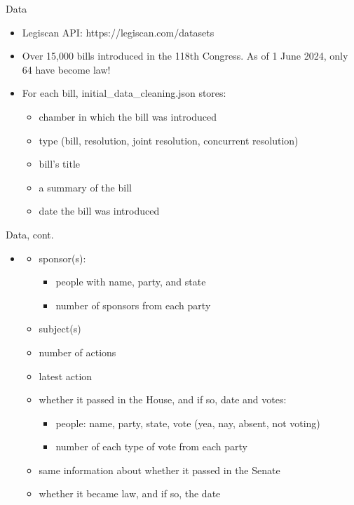 \documentclass[handout,
	12pt]{beamer}
\begin{document}
\begin{frame}{Data}{}
\pause
\begin{itemize}
\item Legiscan API: https://legiscan.com/datasets
\pause
\item Over 15,000 bills introduced in the 118th Congress.  As of 1 June 2024, only 64 have become law!
\pause
\item For each bill, initial\_data\_cleaning.json stores:

\vspace{-0.5pc}
\begin{multicols}{2}
{\small
\begin{itemize}
\itemsep0em
\item chamber in which the bill was introduced
\item type (bill, resolution, joint resolution, concurrent resolution)
\item bill's title
\item a summary of the bill
\item date the bill was introduced
\end{itemize}
}
\end{multicols}
\end{itemize}
\end{frame}
	
\note{
\begin{itemize}
\end{itemize}
}

\begin{frame}{Data, cont.}
\begin{itemize}
\item[]
\begin{multicols}{2}
{\small
\begin{itemize}
\itemsep0em
\item sponsor(s): 
{\footnotesize 
\begin{itemize}
\itemsep0em
\item people with name, party, and state
\item number of sponsors from each party
\end{itemize}
}
\item subject(s)
\item number of actions
\item latest action
\item whether it passed in the House, and if so, date and votes:
{\footnotesize
\begin{itemize}
\itemsep0em
\item people: name, party, state, vote (yea, nay, absent, not voting)
\item number of each type of vote from each party
\end{itemize}
}
\item same information about whether it passed in the Senate
\item whether it became law, and if so, the date
\end{itemize}
}
\end{multicols}
\end{itemize}
\end{frame}
\end{document}
